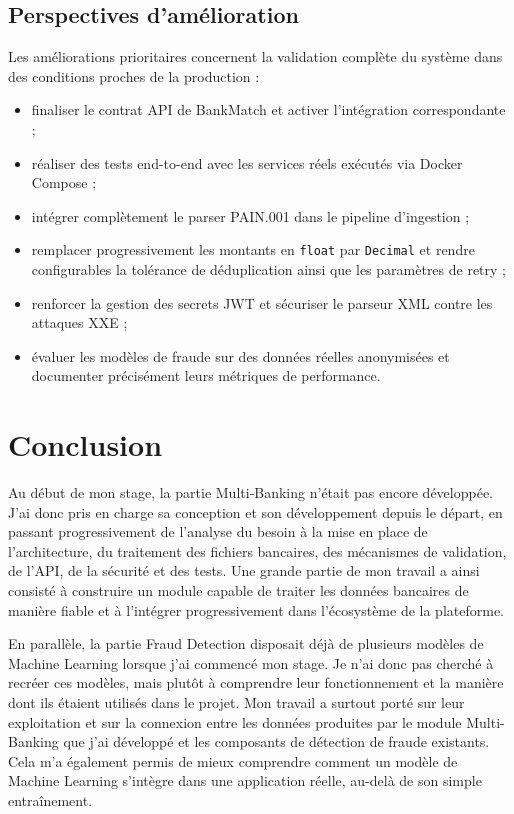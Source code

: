 \documentclass[12pt,a4paper]{extreport}
\begin{document}
\section{Perspectives d'amélioration}

Les améliorations prioritaires concernent la validation complète du système dans des conditions proches de la production :

\begin{itemize}
    \item finaliser le contrat API de BankMatch et activer l'intégration correspondante ;
    \item réaliser des tests end-to-end avec les services réels exécutés via Docker Compose ;
    \item intégrer complètement le parser PAIN.001 dans le pipeline d'ingestion ;
    \item remplacer progressivement les montants en \texttt{float} par \texttt{Decimal} et rendre configurables la tolérance de déduplication ainsi que les paramètres de retry ;
    \item renforcer la gestion des secrets JWT et sécuriser le parseur XML contre les attaques XXE ;
    \item évaluer les modèles de fraude sur des données réelles anonymisées et documenter précisément leurs métriques de performance.
\end{itemize}

\chapter{Conclusion}

Au début de mon stage, la partie Multi-Banking n'était pas encore développée. J'ai donc pris en charge sa conception et son développement depuis le départ, en passant progressivement de l'analyse du besoin à la mise en place de l'architecture, du traitement des fichiers bancaires, des mécanismes de validation, de l'API, de la sécurité et des tests. Une grande partie de mon travail a ainsi consisté à construire un module capable de traiter les données bancaires de manière fiable et à l'intégrer progressivement dans l'écosystème de la plateforme.

En parallèle, la partie Fraud Detection disposait déjà de plusieurs modèles de Machine Learning lorsque j'ai commencé mon stage. Je n'ai donc pas cherché à recréer ces modèles, mais plutôt à comprendre leur fonctionnement et la manière dont ils étaient utilisés dans le projet. Mon travail a surtout porté sur leur exploitation et sur la connexion entre les données produites par le module Multi-Banking que j'ai développé et les composants de détection de fraude existants. Cela m'a également permis de mieux comprendre comment un modèle de Machine Learning s'intègre dans une application réelle, au-delà de son simple entraînement.
\end{document}
